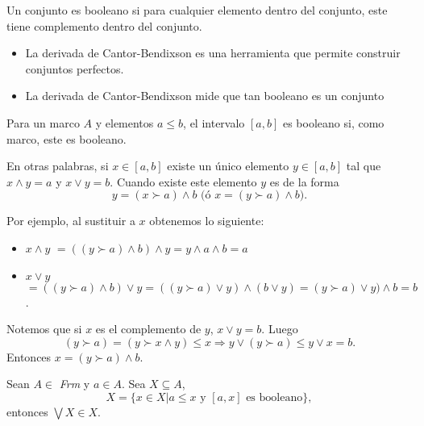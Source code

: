 Un conjunto es booleano si para cualquier elemento dentro del conjunto, este tiene complemento dentro del conjunto.
\begin{itemize}
\item La derivada de Cantor-Bendixson es una herramienta que permite construir conjuntos perfectos.
\item La derivada de Cantor-Bendixson mide que tan booleano es un conjunto
\end{itemize}

\begin{definition}
Para un marco $A$ y elementos $a\leq b$, el intervalo $[a,b]$ es booleano si, como marco, este es booleano.
\end{definition}

\noindent
En otras palabras, si $x\in[a,b]$ existe un único elemento $y\in[a,b]$ tal que $x\wedge y=a$ y $x\vee y=b$. Cuando existe este elemento $y$ es de la forma $$y=(x\succ a)\wedge b\mbox{  (ó }x=(y\succ a)\wedge b).$$

\noindent
Por ejemplo, al sustituir a $x$ obtenemos lo siguiente:

\begin{itemize}
    \item $x\wedge y$ $=((y\succ a)\wedge b)\wedge y=y\wedge a\wedge b=a$
\item $x\vee y$ $=((y\succ a)\wedge b)\vee y=((y\succ a)\vee y)\wedge (b\vee y)=(y\succ a)\vee y)\wedge b=b$.
\end{itemize}

\noindent
Notemos que si $x$ es el complemento de $y$, $x\vee y=b$. Luego $$(y\succ a)=(y\succ x\wedge y)\leq x\Rightarrow y\vee (y\succ a)\leq y\vee x=b.$$
Entonces $x=(y\succ a)\wedge b.$

\begin{lemma}
Sean $A\in$ \textit{Frm} y $a\in A$. Sea $X\subseteq A$, $$X=\{x\in X|a\leq x\mbox{ y } [a, x]\mbox{ es booleano}\},$$ entonces $\bigvee X\in X$. 
\end{lemma}

